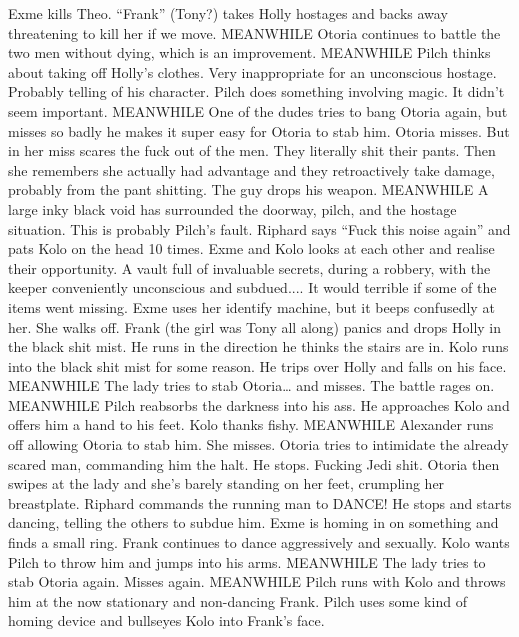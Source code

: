 Exme kills Theo.\medskip
“Frank” (Tony?) takes Holly hostages and backs away threatening to kill her if we move.\medskip
MEANWHILE\medskip
Otoria continues to battle the two men without dying, which is an improvement.\medskip
MEANWHILE\medskip
Pilch thinks about taking off Holly’s clothes. Very inappropriate for an unconscious hostage. Probably telling of his character. Pilch does something involving magic. It didn’t seem important.\medskip
MEANWHILE\medskip
One of the dudes tries to bang Otoria again, but misses so badly he makes it super easy for Otoria to stab him. Otoria misses. But in her miss scares the fuck out of the men. They literally shit their pants. Then she remembers she actually had advantage and they retroactively take damage, probably from the pant shitting. The guy drops his weapon.\medskip
MEANWHILE\medskip
A large inky black void has surrounded the doorway, pilch, and the hostage situation. This is probably Pilch’s fault.\medskip
Riphard says “Fuck this noise again” and pats Kolo on the head 10 times.\medskip
Exme and Kolo looks at each other and realise their opportunity. A vault full of invaluable secrets, during a robbery, with the keeper conveniently unconscious and subdued.... It would terrible if some of the items went missing.\medskip
Exme uses her identify machine, but it beeps confusedly at her. She walks off.\medskip
Frank (the girl was Tony all along) panics and drops Holly in the black shit mist. He runs in the direction he thinks the stairs are in.\medskip
Kolo runs into the black shit mist for some reason. He trips over Holly and falls on his face.\medskip
MEANWHILE\medskip
The lady tries to stab Otoria… and misses. The battle rages on.\medskip
MEANWHILE\medskip
Pilch reabsorbs the darkness into his ass. He approaches Kolo and offers him a hand to his feet. Kolo thanks fishy.\medskip
MEANWHILE\medskip
Alexander runs off allowing Otoria to stab him. She misses. Otoria tries to intimidate the already scared man, commanding him the halt. He stops. Fucking Jedi shit. Otoria then swipes at the lady and she’s barely standing on her feet, crumpling her breastplate.\medskip
Riphard commands the running man to DANCE! He stops and starts dancing, telling the others to subdue him.\medskip
Exme is homing in on something and finds a small ring.\medskip
Frank continues to dance aggressively and sexually.\medskip
Kolo wants Pilch to throw him and jumps into his arms.\medskip
MEANWHILE\medskip
The lady tries to stab Otoria again. Misses again.\medskip
MEANWHILE\medskip
Pilch runs with Kolo and throws him at the now stationary and non-dancing Frank. Pilch uses some kind of homing device and bullseyes Kolo into Frank’s face.\medskip

